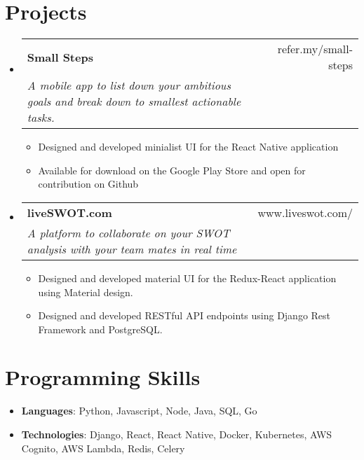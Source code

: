 \documentclass[letterpaper,11pt]{article}
\makeatletter
\newcommand{\resumeItem}[2]{
    \item\small{
      \textbf{#1}{#2 \vspace{-2pt}}
    }
  }
\newcommand{\resumeSubheading}[4]{
    \vspace{-1pt}\item
      \begin{tabular*}{0.97\textwidth}[t]{l@{\extracolsep{\fill}}r}
        \textbf{#1} & #2 \\
        \textit{\small#3} & \textit{\small #4} \\
      \end{tabular*}\vspace{-5pt}
  }
\newcommand{\resumeSubHeadingListStart}{\begin{itemize}[leftmargin=*]}
\newcommand{\resumeSubHeadingListEnd}{\end{itemize}}
\newcommand{\resumeItemListStart}{\begin{itemize}}
\newcommand{\resumeItemListEnd}{\end{itemize}\vspace{-5pt}}
\makeatother
\begin{document}
  \section{Projects}
    \resumeSubHeadingListStart
      \resumeSubheading
        {Small Steps}{refer.my/small-steps}
        {A mobile app to list down your ambitious goals and break down to smallest actionable tasks.}{}
        \resumeItemListStart
          \resumeItem{}
            {Designed and developed minialist UI for the React Native application}
          \resumeItem{}
            {Available for download on the Google Play Store and open for contribution on Github}
        \resumeItemListEnd
      \resumeSubheading
        {liveSWOT.com}{www.liveswot.com/}
        {A platform to collaborate on your SWOT analysis with your team mates in real time}{}
        \resumeItemListStart
          \resumeItem{}
            {Designed and developed material UI for the Redux-React application using Material design.}
          \resumeItem{}
            {Designed and developed RESTful API endpoints using Django Rest Framework and PostgreSQL.}
        \resumeItemListEnd
    \resumeSubHeadingListEnd
  
  \section{Programming Skills}
    \resumeSubHeadingListStart
      \item{
        \textbf{Languages}{: Python, Javascript, Node, Java, SQL, Go}
      }
      \item{
        \textbf{Technologies}{: Django, React, React Native, Docker, Kubernetes, AWS Cognito, AWS Lambda, Redis, Celery}
      }
    \resumeSubHeadingListEnd
  
  
  
\end{document}
